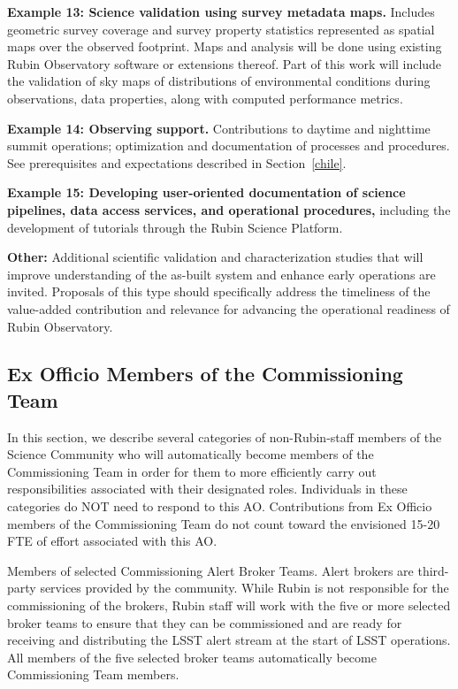 \documentclass[SE,authoryear,toc]{lsstdoc}
\begin{document}
\textbf{Example 13: Science validation using survey metadata maps.} Includes geometric survey coverage and survey property statistics represented as spatial maps over the observed footprint.  Maps and analysis will be done using existing Rubin Observatory software or extensions thereof.  Part of this work will include the validation of sky maps of distributions of environmental conditions during observations, data properties, along with computed performance metrics.

\textbf{Example 14: Observing support.} Contributions to daytime and nighttime summit operations; optimization and documentation of processes and procedures. See prerequisites and expectations described in Section~\ref{chile}.

\textbf{Example 15: Developing user-oriented documentation of science pipelines, data access services, and operational procedures,} including the development of tutorials through the Rubin Science Platform.

\textbf{Other:} Additional scientific validation and characterization studies that will improve understanding of the as-built system and enhance early operations are invited. Proposals of this type should specifically address the timeliness of the value-added contribution and relevance for advancing the operational readiness of Rubin Observatory.

\subsection{Ex Officio Members of the Commissioning Team}

In this section, we describe several categories of non-Rubin-staff members of the Science Community who will automatically become members of the Commissioning Team in order for them to more efficiently carry out responsibilities associated with their designated roles. Individuals in these categories do NOT need to respond to this AO. Contributions from Ex Officio members of the Commissioning Team do not count toward the envisioned 15-20 FTE of effort associated with this AO. 

Members of selected Commissioning Alert Broker Teams. Alert brokers are third-party services provided by the community. While Rubin is not responsible for the commissioning of the brokers, Rubin staff will work with the five or more selected broker teams to ensure that they can be commissioned and are ready for receiving and distributing the LSST alert stream at the start of LSST operations.  All members of the five selected broker teams automatically become Commissioning Team members.
\end{document}
